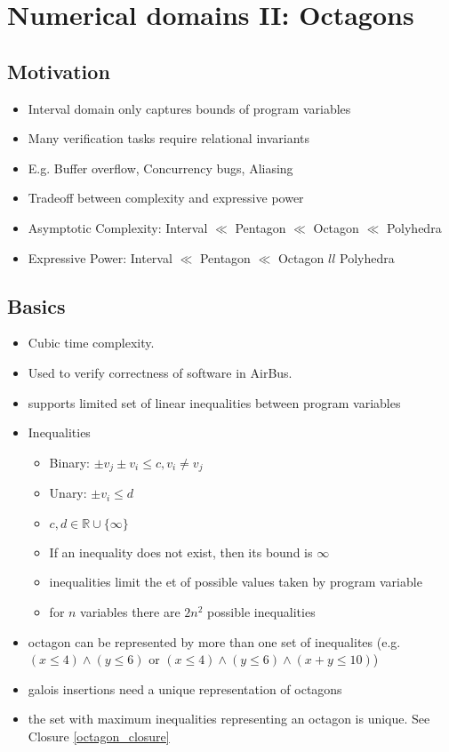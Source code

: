 \chapter{Numerical domains II: Octagons}
\section{Motivation}
\begin{itemize}
\item Interval domain only captures bounds of program variables
\item Many verification tasks require relational invariants
\item E.g. Buffer overflow, Concurrency bugs, Aliasing
\item Tradeoff between complexity and expressive power
\item Asymptotic Complexity: Interval $\ll$ Pentagon $\ll$ Octagon $\ll$ Polyhedra
\item Expressive Power: Interval $\ll$ Pentagon $\ll$ Octagon $ll$ Polyhedra
\end{itemize}
\section{Basics}
\begin{itemize}
\item Cubic time complexity. 
\item Used to verify correctness of software in AirBus.
\item supports limited set of linear inequalities between program variables
\item Inequalities
\begin{itemize}
\item Binary: $\pm v_j \pm v_i \leq c, v_i \neq v_j$
\item Unary: $\pm v_i \leq d$
\item $c,d \in \mathbb{R} \cup \{\infty\}$
\item If an inequality does not exist, then its bound is $\infty$
\item inequalities limit the et of possible values taken by program variable
\item for $n$ variables there are $2n^2$ possible inequalities
\end{itemize}
\item octagon can be represented by more than one set of inequalites (e.g. $(x \leq 4) \wedge (y \leq 6)$ or $(x \leq 4) \wedge (y \leq 6) \wedge (x + y \leq 10)$)
\item galois insertions need a unique representation of octagons
\item the set with maximum inequalities representing an octagon is unique. See Closure \ref{octagon_closure}
\end{itemize}

